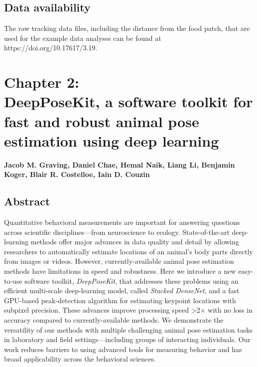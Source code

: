 \documentclass[11pt,a4paper,oneside]{article}
\begin{document}
\subsection{Data availability}
The raw tracking data files, including the distance from the food patch, that are used for the example data analyses can be found at https://doi.org/10.17617/3.19.




\newpage 
	\section[Chapter 2: DeepPoseKit, a software toolkit for animal pose estimation]{\LARGE{Chapter 2:} \\ \Large{DeepPoseKit, a software toolkit for fast and robust animal pose estimation using deep learning}}
	\vspace{5mm}
	\textbf{\normalsize Jacob M. Graving, Daniel Chae, Hemal Naik, Liang Li, Benjamin Koger, Blair R. Costelloe, Iain D. Couzin} \\

	\subsection{Abstract}

    Quantitative behavioral measurements are important for answering questions across scientific disciplines---from neuroscience to ecology. State-of-the-art deep-learning methods offer major advances in data quality and detail by allowing researchers to automatically estimate locations of an animal's body parts directly from images or videos. However, currently-available animal pose estimation methods have limitations in speed and robustness. Here we introduce a new easy-to-use software toolkit, \textit{DeepPoseKit}, that addresses these problems using an efficient multi-scale deep-learning model, called \textit{Stacked DenseNet}, and a fast GPU-based peak-detection algorithm for estimating keypoint locations with subpixel precision. These advances improve processing speed >2$\times$ with no loss in accuracy compared to currently-available methods. We demonstrate the versatility of our methods with multiple challenging animal pose estimation tasks in laboratory and field settings---including groups of interacting individuals. Our work reduces barriers to using advanced tools for measuring behavior and has broad applicability across the behavioral sciences.
\end{document}
